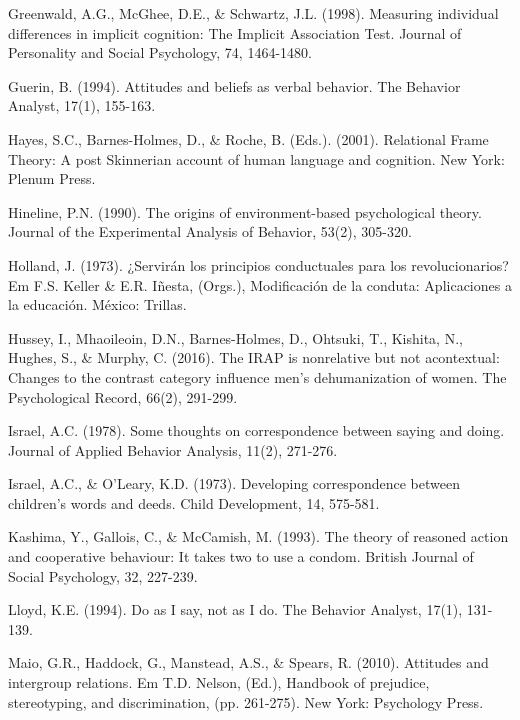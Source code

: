 \hangindent=25pt
\noindent Greenwald, A.G., McGhee, D.E., \& Schwartz, J.L. (1998). Measuring individual differences in implicit cognition: The Implicit Association Test. Journal of Personality and Social Psychology, 74, 1464-1480.

\hangindent=25pt
\noindent Guerin, B. (1994). Attitudes and beliefs as verbal behavior. The Behavior Analyst, 17(1), 155-163.

\hangindent=25pt
\noindent Hayes, S.C., Barnes-Holmes, D., \& Roche, B. (Eds.). (2001). Relational Frame Theory: A post Skinnerian account of human language and cognition. New York: Plenum Press.

\hangindent=25pt
\noindent Hineline, P.N. (1990). The origins of environment-based psychological theory. Journal of the Experimental Analysis of Behavior, 53(2), 305-320.

\hangindent=25pt
\noindent Holland, J. (1973). ¿Servirán los principios conductuales para los revolucionarios? Em F.S. Keller \& E.R. Iñesta, (Orgs.), Modificación de la conduta: Aplicaciones a la educación. México: Trillas.

\hangindent=25pt
\noindent Hussey, I., Mhaoileoin, D.N., Barnes-Holmes, D., Ohtsuki, T., Kishita, N., Hughes, S., \& Murphy, C. (2016). The IRAP is nonrelative but not acontextual: Changes to the contrast category influence men’s dehumanization of women. The Psychological Record, 66(2), 291-299. 

\hangindent=25pt
\noindent Israel, A.C. (1978). Some thoughts on correspondence between saying and doing. Journal of Applied Behavior Analysis, 11(2), 271-276.

\hangindent=25pt
\noindent Israel, A.C., \& O'Leary, K.D. (1973). Developing correspondence between children's words and deeds. Child Development, 14, 575-581.

\hangindent=25pt
\noindent Kashima, Y., Gallois, C., \& McCamish, M. (1993). The theory of reasoned action and cooperative behaviour: It takes two to use a condom. British Journal of Social Psychology, 32, 227-239.

\hangindent=25pt
\noindent Lloyd, K.E. (1994). Do as I say, not as I do. The Behavior Analyst, 17(1), 131-139.

\hangindent=25pt
\noindent Maio, G.R., Haddock, G., Manstead, A.S., \& Spears, R. (2010). Attitudes and intergroup relations. Em T.D. Nelson, (Ed.), Handbook of prejudice, stereotyping, and discrimination, (pp. 261-275). New York: Psychology Press. 

